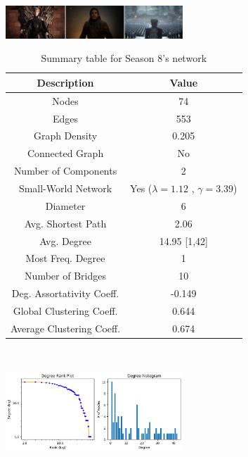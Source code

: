 \documentclass[10pt,twocolumn,letterpaper]{article}
\begin{document}
\begin{center}
    \includegraphics[width=0.5\textwidth]{img/s8/s8_frames.jpg}
\end{center}


\begin{table}[!h]
    \centering
    \small
    \begin{tabular}{c|c}
        Description & Value  \\
        \hline
        Nodes & 74\\
        Edges & 553 \\
        Graph Density & 0.205 \\
        Connected Graph & No \\
        Number of Components & 2 \\
        Small-World Network & Yes ($\lambda=1.12$ , $\gamma=3.39$) \\
        Diameter & 6 \\
        Avg. Shortest Path & 2.06 \\
        Avg. Degree & 14.95 [1,42] \\
        Most Freq. Degree & 1 \\
        Number of Bridges & 10 \\
        Deg. Assortativity Coeff. & -0.149\\
        Global Clustering Coeff. & 0.644 \\
        Average Clustering Coeff. & 0.674 \\
        \hline 
    \end{tabular}
    \vspace{0.2cm}
    \caption{Summary table for Season 8's network}
    \label{tab:my_label}
\end{table} \\

\begin{center}
    \includegraphics[width=0.5\textwidth]{img/s8/degree_plot.jpg}
\end{center}
\end{document}
